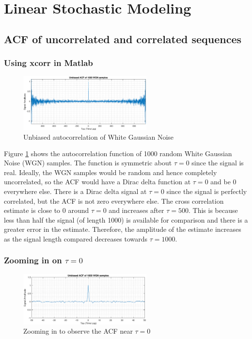 \documentclass{article}
\begin{document}
\section{Linear Stochastic Modeling}
\vspace{0.5cm}


\subsection{ACF of uncorrelated and correlated sequences}


\subsubsection{Using xcorr in Matlab}

\begin{figure}[h!]
\centering
\includegraphics[width=0.6\textwidth]{acf_uncorr}
\caption{\label{fig:acf_uncorr} Unbiased autocorrelation of White Gaussian Noise}
\end{figure}

Figure \ref{fig:acf_uncorr} shows the autocorrelation function of 1000 random White Gaussian Noise (WGN) samples. The function is symmetric about $\tau=0$ since the signal is real. Ideally, the WGN samples would be random and hence completely uncorrelated, so the ACF would have a Dirac delta function at $\tau=0$ and be 0 everywhere else. There is a Dirac delta signal at $\tau=0$ since the signal is perfectly correlated, but the ACF is not zero everywhere else. The cross correlation estimate is close to 0 around $\tau=0$ and increases after $\tau=500$. This is because less than half the signal (of length 1000) is available for comparison and there is a greater error in the estimate. Therefore, the amplitude of the estimate increases as the signal length compared decreases towards $\tau=1000$.

\subsubsection{Zooming in on $\tau=0$}

\begin{figure}[h!]
\centering
\includegraphics[width=0.6\textwidth]{acf_uncorr_zoom}
\caption{\label{fig:acf_uncorr_zoom} Zooming in to observe the ACF near $\tau=0$}
\end{figure}
\end{document}
